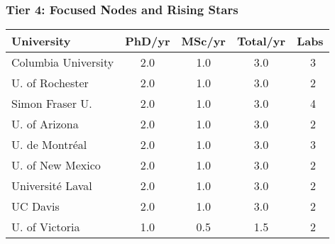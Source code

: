 \documentclass[aspectratio=169]{beamer}
\newcommand{\tabletext}{\normalsize}
\begin{document}
\begin{frame}
    \frametitle{Tier 4: Focused Nodes and Rising Stars}
    \subtitle{Producers with 1-3 total theses per year, often with deep specialization.}
    
    \begin{table}
        \centering
        \tabletext
        \begin{tabularx}{\textwidth}{
            l
            S[table-format=1.1]
            S[table-format=1.1]
            S[table-format=1.1]
            S[table-format=2.0, table-space-text-pre=~]
        }
            \toprule
            \textbf{University} & {\textbf{PhD/yr}} & {\textbf{MSc/yr}} & {\textbf{Total/yr}} & {\textbf{Labs}} \\
            \midrule
            Columbia University & 2.0 & 1.0 & 3.0 & ~3 \\
            U. of Rochester & 2.0 & 1.0 & 3.0 & ~2 \\
            Simon Fraser U. & 2.0 & 1.0 & 3.0 & ~4 \\
            U. of Arizona & 2.0 & 1.0 & 3.0 & ~2 \\
            U. de Montréal & 2.0 & 1.0 & 3.0 & ~3 \\
            U. of New Mexico & 2.0 & 1.0 & 3.0 & ~2 \\
            Université Laval & 2.0 & 1.0 & 3.0 & ~2 \\
            UC Davis & 2.0 & 1.0 & 3.0 & ~2 \\
            U. of Victoria & 1.0 & 0.5 & 1.5 & ~2 \\
            \bottomrule
        \end{tabularx}
    \end{table}
\end{frame}
\end{document}
